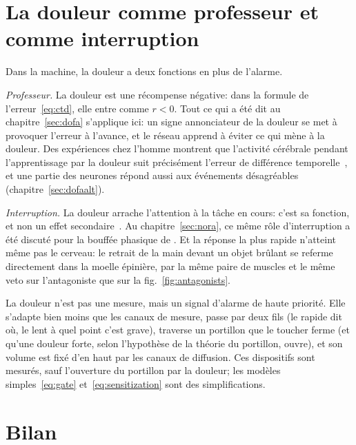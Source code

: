 \section{La douleur comme professeur et comme interruption}

Dans la machine, la douleur a deux fonctions en plus de l'alarme.

\emph{Professeur.} La douleur est une récompense négative: dans la formule de l'erreur~\eqref{eq:ctd}, elle entre comme $r<0$. Tout ce qui a été dit au chapitre~\ref{sec:dofa} s'applique ici: un signe annonciateur de la douleur se met à provoquer l'erreur à l'avance, et le réseau apprend à éviter ce qui mène à la douleur. Des expériences chez l'homme montrent que l'activité cérébrale pendant l'apprentissage par la douleur suit précisément l'erreur de différence temporelle~\cite{Seymour2004}, et une partie des neurones  répond aussi aux événements désagréables (chapitre~\ref{sec:dofaalt}).

\emph{Interruption.} La douleur arrache l'attention à la tâche en cours: c'est sa fonction, et non un effet secondaire~\cite{EcclestonCrombez1999}. Au chapitre~\ref{sec:nora}, ce même rôle d'\og interruption\fg{} a été discuté pour la bouffée phasique de . Et la réponse la plus rapide n'atteint même pas le cerveau: le retrait de la main devant un objet brûlant se referme directement dans la moelle épinière, par la même paire de muscles et le même veto sur l'antagoniste que sur la fig.~\ref{fig:antagonists}.

\begin{keyblock}
\begin{proposition}
\label{prop:pain}
La douleur n'est pas une mesure, mais un signal d'alarme de haute priorité. Elle s'adapte bien moins que les canaux de mesure, passe par deux fils (le rapide dit \og où\fg{}, le lent \og à quel point c'est grave\fg{}), traverse un portillon que le toucher ferme (et qu'une douleur forte, selon l'hypothèse de la théorie du portillon, ouvre), et son volume est fixé d'en haut par les canaux de diffusion. Ces dispositifs sont mesurés, sauf l'ouverture du portillon par la douleur; les modèles simples~\eqref{eq:gate} et~\eqref{eq:sensitization} sont des simplifications.
\end{proposition}
\end{keyblock}

\section{Bilan}


